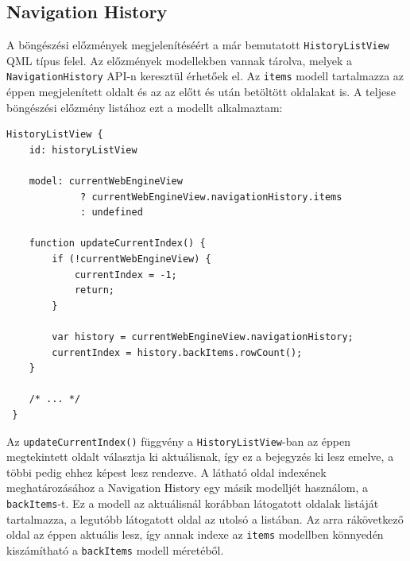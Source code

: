 \documentclass[12pt]{report}
\begin{document}
\subsection{Navigation History}
A böngészési előzmények megjelenítéséért a már bemutatott \texttt{HistoryListView}
QML típus felel. Az előzmények modellekben vannak tárolva, melyek a
\texttt{NavigationHistory} API-n keresztül érhetőek el. Az \texttt{items} modell tartalmazza
az éppen megjelenített oldalt és az az előtt és után betöltött oldalakat is.
A teljese böngészési előzmény listához ezt a modellt alkalmaztam:
\begin{lstlisting}[title=main.qml]
 HistoryListView {
    id: historyListView

    model: currentWebEngineView
             ? currentWebEngineView.navigationHistory.items
             : undefined

    function updateCurrentIndex() {
        if (!currentWebEngineView) {
            currentIndex = -1;
            return;
        }

        var history = currentWebEngineView.navigationHistory;
        currentIndex = history.backItems.rowCount();
    }

    /* ... */
 }
\end{lstlisting}
Az \texttt{updateCurrentIndex()} függvény a \texttt{HistoryListView}-ban az éppen megtekintett
oldalt választja ki aktuálisnak, így ez a bejegyzés ki lesz emelve, a többi pedig ehhez
képest lesz rendezve. A látható oldal indexének meghatározásához a Navigation History egy
másik modelljét használom, a \texttt{backItems}-t. Ez a modell az aktuálisnál korábban
látogatott oldalak listáját tartalmazza, a legutóbb látogatott oldal az utolsó a listában.
Az arra rákövetkező oldal az éppen aktuális lesz, így annak indexe az \texttt{items} modellben
könnyedén kiszámítható a \texttt{backItems} modell méretéből.
\end{document}
